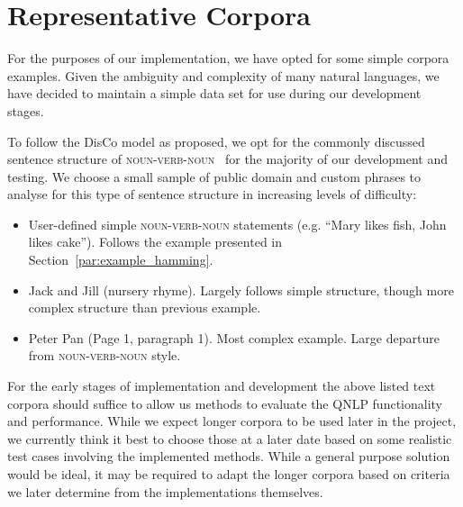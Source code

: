 \section{Representative Corpora}
\label{sec:representative_corpora}
For the purposes of our implementation, we have opted for some simple corpora examples. Given the ambiguity and complexity of many natural languages, we have decided to maintain a simple data set for use during our development stages.

To follow the DisCo model as proposed, we opt for the commonly discussed sentence structure of \textsc{noun-verb-noun}~\cite{Zeng_Coecke_2016,Coecke_Sadrzadeh_Clark_2010} for the majority of our development and testing. We choose a small sample of public domain and custom phrases to analyse for this type of sentence structure in increasing levels of difficulty:
\begin{itemize}
    \item User-defined simple \textsc{noun-verb-noun} statements (e.g. ``Mary likes fish, John likes cake''). Follows the example presented in Section~\ref{par:example_hamming}.
    \item Jack and Jill (nursery rhyme). Largely follows simple structure, though more complex structure than previous example.
    \item Peter Pan (Page 1, paragraph 1). Most complex example. Large departure from \textsc{noun-verb-noun} style.
\end{itemize}
For the early stages of implementation and development the above listed text corpora should suffice to allow us methods to evaluate the QNLP functionality and performance. While we expect longer corpora to be used later in the project, we currently think it best to choose those at a later date based on some realistic test cases involving the implemented methods. While a general purpose solution would be ideal, it may be required to adapt the longer corpora based on criteria we later determine from the implementations themselves.


